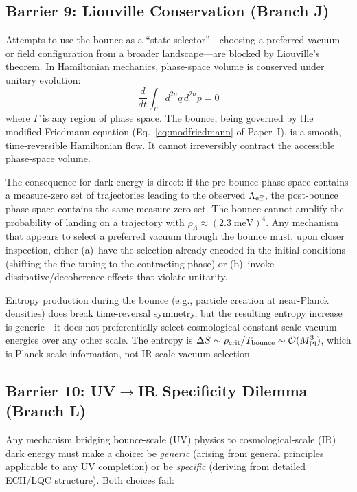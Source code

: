 \documentclass[a4paper,11pt]{article}
\newcommand{\Mpl}{M_{\rm Pl}}
\begin{document}
\subsection{Barrier 9: Liouville Conservation (Branch J)}

Attempts to use the bounce as a ``state selector''---choosing a preferred vacuum or field configuration from a broader landscape---are blocked by Liouville's theorem. In Hamiltonian mechanics, phase-space volume is conserved under unitary evolution:
\begin{equation}
\frac{d}{dt}\int_{\Gamma} d^{2n}q\,d^{2n}p = 0
\end{equation}
where $\Gamma$ is any region of phase space. The bounce, being governed by the modified Friedmann equation (Eq.~\ref{eq:modfriedmann} of Paper~I), is a smooth, time-reversible Hamiltonian flow. It cannot irreversibly contract the accessible phase-space volume.

The consequence for dark energy is direct: if the pre-bounce phase space contains a measure-zero set of trajectories leading to the observed $\Lambda_{\rm eff}$, the post-bounce phase space contains the same measure-zero set. The bounce cannot amplify the probability of landing on a trajectory with $\rho_\Lambda \approx (2.3\;\text{meV})^4$. Any mechanism that appears to select a preferred vacuum through the bounce must, upon closer inspection, either (a)~have the selection already encoded in the initial conditions (shifting the fine-tuning to the contracting phase) or (b)~invoke dissipative/decoherence effects that violate unitarity.

Entropy production during the bounce (e.g., particle creation at near-Planck densities) does break time-reversal symmetry, but the resulting entropy increase is generic---it does not preferentially select cosmological-constant-scale vacuum energies over any other scale. The entropy is $\Delta S \sim \rho_{\rm crit}/T_{\rm bounce} \sim \mathcal{O}(\Mpl^3)$, which is Planck-scale information, not IR-scale vacuum selection.

\subsection{Barrier 10: UV$\to$IR Specificity Dilemma (Branch L)}

Any mechanism bridging bounce-scale (UV) physics to cosmological-scale (IR) dark energy must make a choice: be \emph{generic} (arising from general principles applicable to any UV completion) or be \emph{specific} (deriving from detailed ECH/LQC structure). Both choices fail:
\end{document}
